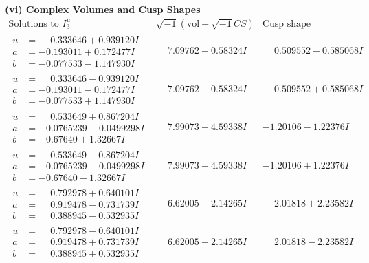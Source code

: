 \documentclass[1p]{elsarticle_modified}
\theoremstyle{definition}
\newcommand{\I}{\sqrt{-1}}
\begin{document}
\newpage\flushleft \textbf{(vi) Complex Volumes and Cusp Shapes}
$$\begin{array}{c|c|c}  
\text{Solutions to }I^u_{3}& \I (\text{vol} + \sqrt{-1}CS) & \text{Cusp shape}\\
 \hline 
\begin{aligned}
u &= \phantom{-}0.333646 + 0.939120 I \\
a &= -0.193011 + 0.172477 I \\
b &= -0.077533 - 1.147930 I\end{aligned}
 & \phantom{-}7.09762 - 0.58324 I & \phantom{-}0.509552 - 0.585068 I \\ \hline\begin{aligned}
u &= \phantom{-}0.333646 - 0.939120 I \\
a &= -0.193011 - 0.172477 I \\
b &= -0.077533 + 1.147930 I\end{aligned}
 & \phantom{-}7.09762 + 0.58324 I & \phantom{-}0.509552 + 0.585068 I \\ \hline\begin{aligned}
u &= \phantom{-}0.533649 + 0.867204 I \\
a &= -0.0765239 - 0.0499298 I \\
b &= -0.67640 + 1.32667 I\end{aligned}
 & \phantom{-}7.99073 + 4.59338 I & -1.20106 - 1.22376 I \\ \hline\begin{aligned}
u &= \phantom{-}0.533649 - 0.867204 I \\
a &= -0.0765239 + 0.0499298 I \\
b &= -0.67640 - 1.32667 I\end{aligned}
 & \phantom{-}7.99073 - 4.59338 I & -1.20106 + 1.22376 I \\ \hline\begin{aligned}
u &= \phantom{-}0.792978 + 0.640101 I \\
a &= \phantom{-}0.919478 - 0.731739 I \\
b &= \phantom{-}0.388945 - 0.532935 I\end{aligned}
 & \phantom{-}6.62005 - 2.14265 I & \phantom{-}2.01818 + 2.23582 I \\ \hline\begin{aligned}
u &= \phantom{-}0.792978 - 0.640101 I \\
a &= \phantom{-}0.919478 + 0.731739 I \\
b &= \phantom{-}0.388945 + 0.532935 I\end{aligned}
 & \phantom{-}6.62005 + 2.14265 I & \phantom{-}2.01818 - 2.23582 I \\ \hline\begin{aligned}

\end{aligned}
\end{array}$$
\end{document}
